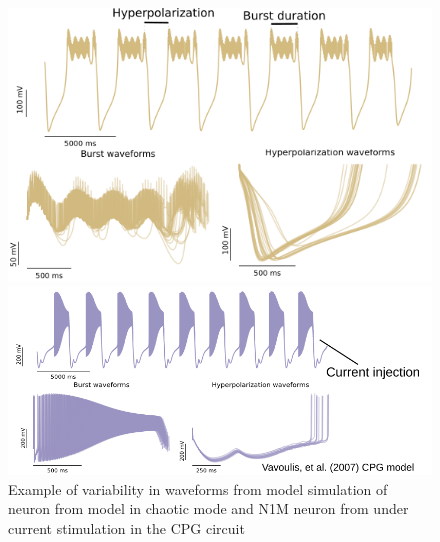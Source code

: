 \begin{figure}[hbt]
	\centering
	\begin{minipage}{0.48\textwidth}
		\includegraphics[width=\textwidth]{img/invariants/variability/TN-burst_variability.png}
	\end{minipage}
	\begin{minipage}{0.48\textwidth}
		\includegraphics[width=\textwidth]{img/invariants/variability/n1m_vav_burst_variability.png}
	\end{minipage}
	\caption{Example of variability in waveforms from model simulation of neuron from \cite{nowotny_probing_2008} model in chaotic mode and N1M neuron from \cite{vavoulis_dynamic_2007} under current stimulation in the CPG circuit}
	\label{fig:model burst variability}
\end{figure}


